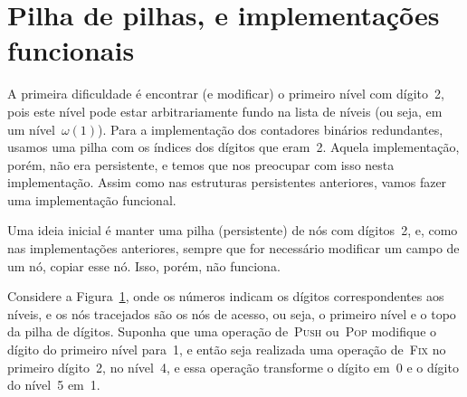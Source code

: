 \documentclass[../../main.tex]{subfiles}
\begin{document}
\section{Pilha de pilhas, e implementações funcionais} \label{sec:implfunc}

A primeira dificuldade é encontrar (e modificar) o primeiro nível com dígito~2, pois este nível pode estar arbitrariamente fundo na lista de níveis (ou seja, em um nível~$\omega(1)$). Para a implementação dos contadores binários redundantes, usamos uma pilha com os índices dos dígitos que eram~2. Aquela implementação, porém, não era persistente, e temos que nos preocupar com isso nesta implementação. Assim como nas estruturas persistentes anteriores, vamos fazer uma implementação funcional.


\begin{figure}
\centering
{}
\caption{} \label{fig:func_ex1}
\end{figure}

Uma ideia inicial é manter uma pilha (persistente) de nós com dígitos~2, e, como nas implementações anteriores, sempre que for necessário modificar um campo de um nó, copiar esse nó. Isso, porém, não funciona.

Considere a Figura~\ref{fig:func_ex1}, onde os números indicam os dígitos correspondentes aos níveis, e os nós tracejados são os nós de acesso, ou seja, o primeiro nível e o topo da pilha de dígitos. Suponha que uma operação de~\textsc{Push} ou~\textsc{Pop} modifique o dígito do primeiro nível para~1, e então seja realizada uma operação de~\textsc{Fix} no primeiro dígito~2, no nível~4, e essa operação transforme o dígito em~0 e o dígito do nível~5 em~1.
\end{document}

